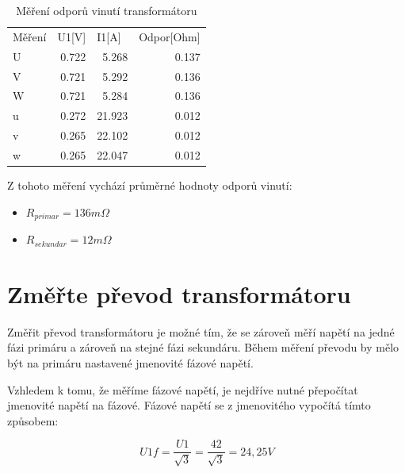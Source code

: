 \documentclass{protokol}
\begin{document}
\begin{table}[H]
\centering
\caption{Měření odporů vinutí transformátoru}
\begin{tabular}{lrrr}
\rowcolor[HTML]{F8F9FA} 
Měření & \multicolumn{1}{l}{\cellcolor[HTML]{F8F9FA}U1{[}V{]}} & \multicolumn{1}{l}{\cellcolor[HTML]{F8F9FA}I1{[}A{]}} & \multicolumn{1}{l}{\cellcolor[HTML]{F8F9FA}Odpor{[}Ohm{]}} \\
\cellcolor[HTML]{FFFFFF}U & \cellcolor[HTML]{FFFFFF}0.722 & 5.268 & 0.137 \\
V & 0.721 & 5.292 & 0.136 \\
W & 0.721 & 5.284 & 0.136 \\
u & 0.272 & 21.923 & 0.012 \\
v & 0.265 & 22.102 & 0.012 \\
w & 0.265 & 22.047 & 0.012
\end{tabular}
\label{tab:MereniOdporuVinuti}
\end{table}

Z tohoto měření vychází průměrné hodnoty odporů vinutí:
\begin{itemize}
    \item $R_{primar} = 136 m\Omega$
    \item $R_{sekundar} = 12 m\Omega$
\end{itemize}

\section{Změřte převod transformátoru}
Změřit převod transformátoru je možné tím, že se zároveň měří napětí na jedné fázi primáru a zároveň na stejné fázi sekundáru. Během měření převodu by mělo být na primáru nastavené jmenovité fázové napětí.

Vzhledem k tomu, že měříme fázové napětí, je nejdříve nutné přepočítat jmenovité napětí na fázové. Fázové napětí se z jmenovitého vypočítá tímto způsobem:

\begin{equation}
    U1f = \frac{U1}{\sqrt{3}} = \frac{42}{\sqrt{3}} = 24,25 V
    \label{eq:PrevodNominalnihoNapetiNaFazove}
\end{equation}
\end{document}
